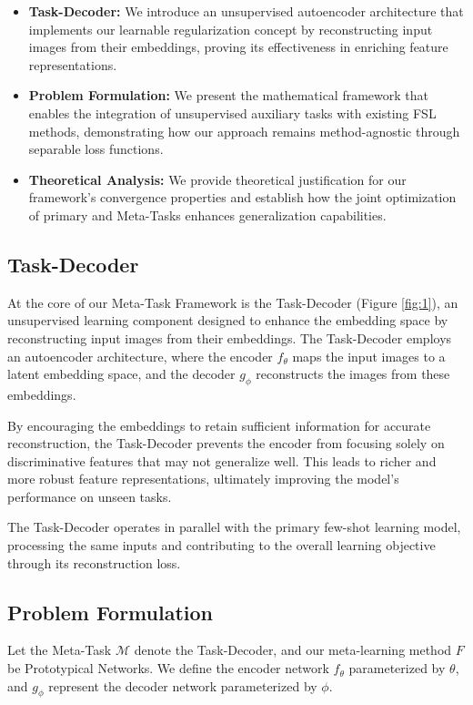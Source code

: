 \begin{itemize}
\item \textbf{Task-Decoder:} We introduce an unsupervised autoencoder architecture that implements our learnable regularization concept by reconstructing input images from their embeddings, proving its effectiveness in enriching feature representations.
\item \textbf{Problem Formulation:} We present the mathematical framework that enables the integration of unsupervised auxiliary tasks with existing FSL methods, demonstrating how our approach remains method-agnostic through separable loss functions.
\item \textbf{Theoretical Analysis:} We provide theoretical justification for our framework's convergence properties and establish how the joint optimization of primary and Meta-Tasks enhances generalization capabilities.
\end{itemize}

\subsection{Task-Decoder}

At the core of our Meta-Task Framework is the Task-Decoder (Figure \ref{fig:1}), an unsupervised learning component designed to enhance the embedding space by reconstructing input images from their embeddings. The Task-Decoder employs an autoencoder architecture, where the encoder \( f_{\theta} \) maps the input images to a latent embedding space, and the decoder \( g_{\phi} \) reconstructs the images from these embeddings.

By encouraging the embeddings to retain sufficient information for accurate reconstruction, the Task-Decoder prevents the encoder from focusing solely on discriminative features that may not generalize well. This leads to richer and more robust feature representations, ultimately improving the model's performance on unseen tasks.

The Task-Decoder operates in parallel with the primary few-shot learning model, processing the same inputs and contributing to the overall learning objective through its reconstruction loss.

\subsection{Problem Formulation}

Let the Meta-Task $\mathcal{M}$ denote the Task-Decoder, and our meta-learning method $F$ be Prototypical Networks. We define the encoder network \( f_{\theta} \) parameterized by \( \theta \), and \( g_{\phi} \) represent the decoder network parameterized by \( \phi \). 

